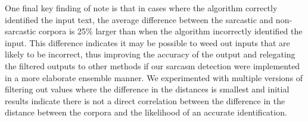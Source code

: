 \documentclass[conference]{IEEEtran}
\begin{document}
One final key finding of note is that in cases where the algorithm correctly identified the input text, the average difference between the sarcastic and non-sarcastic corpora is 25\% larger than when the algorithm incorrectly identified the input.  This difference indicates it may be possible to weed out inputs that are likely to be incorrect, thus improving the accuracy of the output and relegating the filtered outputs to other methods if our sarcasm detection were implemented in a more elaborate ensemble manner.  We experimented with multiple versions of filtering out values where the difference in the distances is smallest and initial results indicate there is not a direct correlation between the difference in the distance between the corpora and the likelihood of an accurate identification.\\
\end{document}
